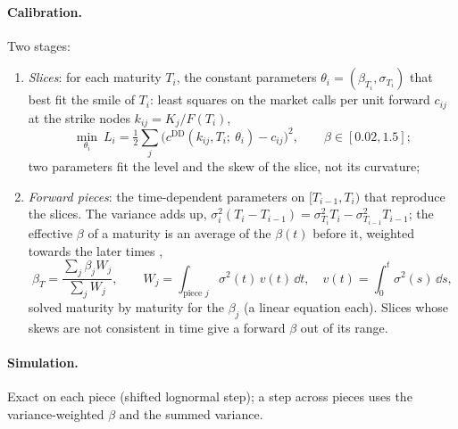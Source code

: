 \paragraph{Calibration.} Two stages:
\begin{enumerate}[nosep]
  \item \emph{Slices}: for each maturity $T_i$, the constant parameters $\theta_i = (\beta_{T_i}, \sigma_{T_i})$ that best fit the smile of $T_i$:
        least squares on the market calls per unit forward $c_{ij}$ at the strike nodes $k_{ij} = K_j / F(T_i)$,
        \[
          \min_{\theta_i}\ L_i = \tfrac12 \sum_j \big(c^{\mathrm{DD}}(k_{ij}, T_i;\ \theta_i) - c_{ij}\big)^2 ,\qquad \beta \in [0.02, 1.5];
        \]
        two parameters fit the level and the skew of the slice, not its curvature;
  \item \emph{Forward pieces}: the time-dependent parameters on $[T_{i-1}, T_i)$ that reproduce the slices. The variance adds
        up, $\sigma_i^2 (T_i - T_{i-1}) = \sigma_{T_i}^2 T_i - \sigma_{T_{i-1}}^2 T_{i-1}$; the effective $\beta$ of a maturity is an average of
        the $\beta(t)$ before it, weighted towards the later times \citep{piterbarg2005,andersen2010},
        \[
          \beta_{T} = \frac{\sum_j \beta_j W_j}{\sum_j W_j},\qquad W_j = \int_{\text{piece } j} \sigma^2(t)\,v(t)\,\dd t,\quad v(t) = \int_0^t \sigma^2(s)\,\dd s ,
        \]
        solved maturity by maturity for the $\beta_j$ (a linear equation each). Slices whose skews are not consistent in
        time give a forward $\beta$ out of its range.
\end{enumerate}

\paragraph{Simulation.} Exact on each piece (shifted lognormal step); a step across pieces uses the variance-weighted
$\beta$ and the summed variance.

